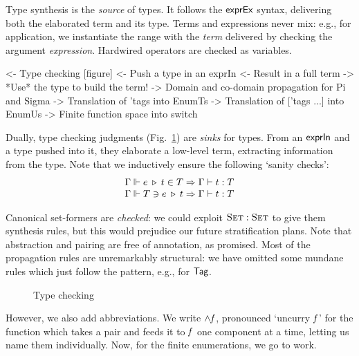 Type synthesis is the \emph{source} of types. It follows the \(\textsf{exprEx}\)
syntax, delivering both the elaborated term and its type. Terms
and expressions never mix: e.g., for application, we
instantiate the range with the \emph{term} delivered by checking the
argument \emph{expression}. Hardwired operators are checked as variables.


%



\begin{wstructure}
<- Type checking [figure]
    <- Push a type in an exprIn
    <- Result in a full term
    -> *Use* the type to build the term!
        -> Domain and co-domain propagation for Pi and Sigma
        -> Translation of 'tags into EnumTs
        -> Translation of ['tags ...] into EnumUs
        -> Finite function space into switch
\end{wstructure}

Dually, type checking judgments (Fig.~\ref{fig:type-checking})
are \emph{sinks} for types. From an
$\textsf{exprIn}$ and a type pushed into it, they elaborate a low-level
term, extracting information from the type. Note that we inductively ensure the following `sanity checks':
%
\[\stkc{
\Gamma\Vdash\propag{e}{\pull{t}{T}} \Rightarrow
  \Gamma\vdash t:T \\
\Gamma\Vdash\push{\propag{e}{t}}{T} \Rightarrow
  \Gamma\vdash t:T
}\]

Canonical set-formers are \emph{checked}: we could exploit
\(\Set:\Set\) to give them synthesis rules, but this would prejudice
our future stratification plans. Note that abstraction and pairing are
free of annotation, as promised. Most of the propagation rules are
unremarkably structural: we have omitted some mundane rules which just
follow the pattern, e.g., for \(\UId\).

\begin{figure}

\caption{Type checking}
\label{fig:type-checking}
\end{figure}

However, we also add abbreviations. We write \(\spl{\M{f}}\),
pronounced `uncurry \(\mathit{f}\)' for the function which takes a pair and
feeds it to \(\mathit{f}\) one component at a time, letting us name
them individually. Now, for the finite enumerations, we go to work.

